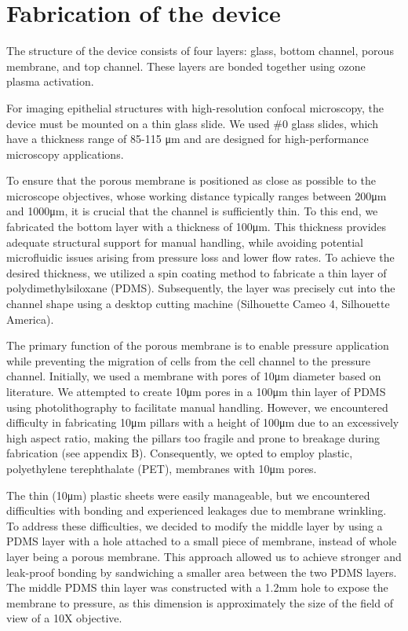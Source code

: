 \hypertarget{fabrication-of-the-device}{%
\section{Fabrication of the device}\label{fabrication-of-the-device}}

The structure of the device consists of four layers: glass, bottom channel, porous membrane, and top channel. These layers are bonded together using ozone plasma activation.

For imaging epithelial structures with high-resolution confocal microscopy, the device must be mounted on a thin glass slide. We used \#0 glass slides, which have a thickness range of 85-115 \unit{\um} and are designed for high-performance microscopy applications. 

To ensure that the porous membrane is positioned as close as possible to the microscope objectives, whose working distance typically ranges between 200\unit{\um} and 1000\unit{\um}, it is crucial that the channel is sufficiently thin. To this end, we fabricated the bottom layer with a thickness of 100\unit{\um}. This thickness provides adequate structural support for manual handling, while avoiding potential microfluidic issues arising from pressure loss and lower flow rates. To achieve the desired thickness, we utilized a spin coating method to fabricate a thin layer of polydimethylsiloxane (PDMS). Subsequently, the layer was precisely cut into the channel shape using a desktop cutting machine (Silhouette Cameo 4, Silhouette America).

The primary function of the porous membrane is to enable pressure application while preventing the migration of cells from the cell channel to the pressure channel. Initially, we used a membrane with pores of 10\unit{\um} diameter based on literature. We attempted to create 10\unit{\um} pores in a 100\unit{\um} thin layer of PDMS using photolithography to facilitate manual handling. However, we encountered difficulty in fabricating 10\unit{\um} pillars with a height of 100\unit{\um} due to an excessively high aspect ratio, making the pillars too fragile and prone to breakage during fabrication (see appendix B). Consequently, we opted to employ plastic, polyethylene terephthalate (PET), membranes with 10\unit{\um} pores. 

The thin (10\unit{\um}) plastic sheets were easily manageable, but we encountered difficulties with bonding and experienced leakages due to membrane wrinkling. To address these difficulties, we decided to modify the middle layer by using a PDMS layer with a hole attached to a small piece of membrane, instead of whole layer being a porous membrane. This approach allowed us to achieve stronger and leak-proof bonding by sandwiching a smaller area between the two PDMS layers. The middle PDMS thin layer was constructed with a 1.2\unit{\mm} hole to expose the membrane to pressure, as this dimension is approximately the size of the field of view of a 10X objective.

